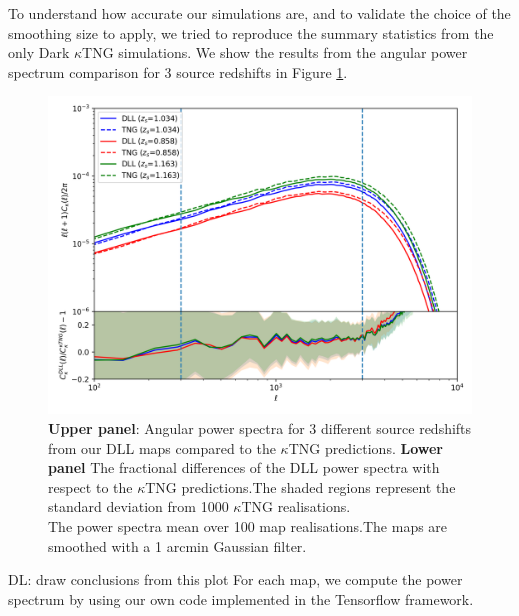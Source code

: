 \documentclass[twocolumn,twocolappendix]{aastex63}
\newcommand{\denise}[1]{{\color{red}DL: #1}}
\begin{document}
To understand how accurate our simulations are, and to validate the choice of the smoothing size to apply, we tried to reproduce the summary statistics from the only Dark $\kappa$TNG simulations. 
 We show the results from the angular power spectrum comparison for 3 source redshifts in Figure \ref{fig:clsktng_comp1arc}.
\begin{figure}
    \centering
    \includegraphics[width=\columnwidth]{paper/figures/clsktng_comp1arc.png}
    \caption{
    \textbf{Upper panel}: Angular power spectra for 3 different source redshifts from
our DLL maps compared to the $\kappa$TNG predictions.
 \textbf{Lower panel}
The fractional differences of the DLL power spectra with respect to the $\kappa$TNG predictions.The shaded regions represent the standard deviation from 1000 $\kappa$TNG realisations. \\
 The power spectra mean over 100 map realisations.The maps are smoothed with a 1 arcmin Gaussian filter. }
    \label{fig:clsktng_comp1arc}
\end{figure}
\denise{draw conclusions from this plot}
For each map, we compute the power spectrum by using our own code implemented in the Tensorflow framework.
\end{document}
